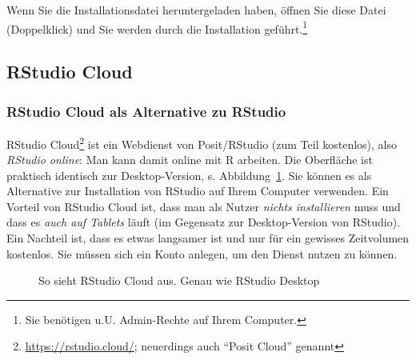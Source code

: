 \documentclass[
  a4paper,
  DIV=11]{scrreprt}
\theoremstyle{definition}
\theoremstyle{definition}
\theoremstyle{definition}
\theoremstyle{remark}
\begin{document}
Wenn Sie die Installationsdatei heruntergeladen haben, öffnen Sie diese
Datei (Doppelklick) und Sie werden durch die Installation
geführt.\footnote{Sie benötigen u.U. Admin-Rechte auf Ihrem Computer.}

\subsection{RStudio Cloud}\label{rstudio-cloud}

\subsubsection{RStudio Cloud als Alternative zu
RStudio}\label{rstudio-cloud-als-alternative-zu-rstudio}

RStudio Cloud\footnote{\url{https://rstudio.cloud/}; neuerdings auch
  ``Posit Cloud'' genannt} ist ein Webdienst von Posit/RStudio (zum Teil
kostenlos), also \emph{RStudio online}: Man kann damit online mit R
arbeiten. Die Oberfläche ist praktisch identisch zur Desktop-Version, s.
Abbildung~\ref{fig-rstudio-cloud}. Sie können es als Alternative zur
Installation von RStudio auf Ihrem Computer verwenden. Ein Vorteil von
RStudio Cloud ist, dass man als Nutzer \emph{nichts installieren} muss
und dass es \emph{auch auf Tablets} läuft (im Gegensatz zur
Desktop-Version von RStudio). Ein Nachteil ist, dass es etwas langsamer
ist und nur für ein gewisses Zeitvolumen kostenlos. Sie müssen sich ein
Konto anlegen, um den Dienst nutzen zu können.

\begin{figure}


\caption{\label{fig-rstudio-cloud}So sieht RStudio Cloud aus. Genau wie
RStudio Desktop}

\end{figure}%
\end{document}
